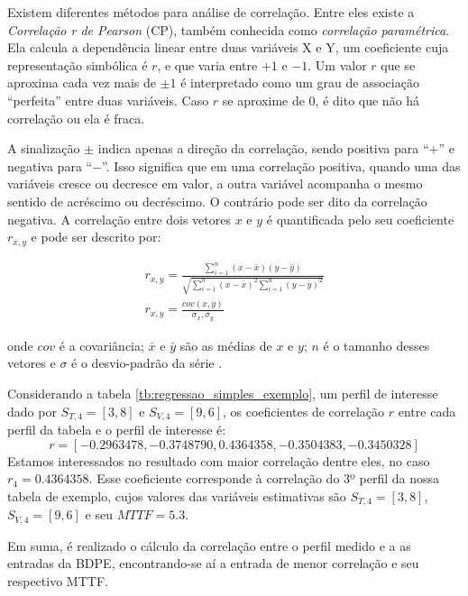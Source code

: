 Existem diferentes métodos para análise de correlação. Entre eles existe a \textit{Correlação r de Pearson} (CP), também conhecida como \textit{correlação paramétrica}. Ela calcula a dependência linear entre duas variáveis X e Y, um coeficiente cuja representação simbólica é $r$, e que varia entre $+1$ e $-1$. Um valor $r$ que se aproxima cada vez mais de $\pm1$ é interpretado como um grau de associação ``perfeita'' entre duas variáveis. Caso $r$ se aproxime de $0$, é dito que não há correlação ou ela é fraca.

A sinalização $\pm$ indica apenas a direção da correlação, sendo positiva para ``$+$'' e negativa para ``$-$''. Isso significa que em uma correlação positiva, quando uma das variáveis cresce ou decresce em valor, a outra variável acompanha o mesmo sentido de acréscimo ou decréscimo. O contrário pode ser dito da correlação negativa.
A correlação entre dois vetores $x$ e $y$ é quantificada pelo seu coeficiente $r_{x,y}$ e pode ser descrito por:

\begin{align}
r_{x,y}= \frac{\sum_{i=1}^{n}(x-\bar{x})(y-\bar{y})}{\sqrt{\sum_{i=1}^{n}(x-\bar{x})^2 \sum_{i=1}^{n}(y-\bar{y})^2}} \\
r_{x,y}=\frac{cov(x,y)}{\sigma_x,\sigma_y}
\label{eq:correlacao}
\end{align}

onde $cov$ é a covariância; $\bar{x}$ e $\bar{y}$ são as médias de $x$ e $y$; $n$ é o tamanho desses vetores e $\sigma$ é o desvio-padrão da série \cite{Chatterjee}.

Considerando a tabela \ref{tb:regressao_simples_exemplo}, um perfil de interesse dado por $S_{T,4} = [3,8]$ e $S_{V,4} = [9,6]$, os coeficientes de correlação $r$ entre cada perfil da tabela e o perfil de interesse é:
\begin{equation}
r = [-0.2963478, -0.3748790,  0.4364358, -0.3504383, -0.3450328]
\end{equation}
Estamos interessados no resultado com maior correlação dentre eles, no caso $r_4=0.4364358$. Esse coeficiente corresponde à correlação do 3º perfil da nossa tabela de exemplo, cujos valores das variáveis estimativas são $S_{T,4} = [3,8]$, $S_{V,4} = [9,6]$ e seu $MTTF=5.3$.

Em suma, é realizado o cálculo da correlação entre o perfil medido e a as entradas da BDPE, encontrando-se aí a entrada de menor correlação e seu respectivo MTTF.

